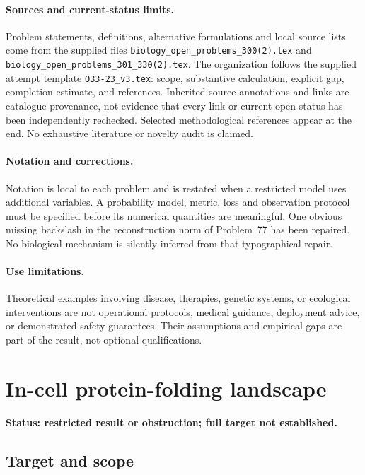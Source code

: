 \documentclass[11pt]{article}
\begin{document}
\paragraph{Sources and current-status limits.}
Problem statements, definitions, alternative formulations and local source lists
come from the supplied files
\texttt{biology\_open\_problems\_300(2).tex} and
\texttt{biology\_open\_problems\_301\_330(2).tex}.
The organization follows the supplied attempt template
\texttt{O33-23\_v3.tex}: scope, substantive calculation, explicit gap,
completion estimate, and references. Inherited source annotations and links are
catalogue provenance, not evidence that every link or current open status has
been independently rechecked. Selected methodological references appear at the
end. No exhaustive literature or novelty audit is claimed.

\paragraph{Notation and corrections.}
Notation is local to each problem and is restated when a restricted model uses
additional variables. A probability model, metric, loss and observation protocol
must be specified before its numerical quantities are meaningful. One obvious
missing backslash in the reconstruction norm of Problem~77 has been repaired.
No biological mechanism is silently inferred from that typographical repair.

\paragraph{Use limitations.}
Theoretical examples involving disease, therapies, genetic systems, or ecological
interventions are not operational protocols, medical guidance, deployment advice,
or demonstrated safety guarantees. Their assumptions and empirical gaps are part
of the result, not optional qualifications.


\section*{In-cell protein-folding landscape}
\label{prob:001}
\noindent\textbf{Status: restricted result or obstruction; full target not established.}
\subsection{Target and scope}
\end{document}
